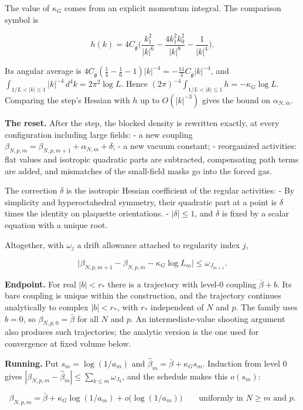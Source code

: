 \documentclass[
  letterpaper,
  11pt]{article}
\begin{document}
The value of \(\kappa_G\) comes from an explicit momentum integral. The
comparison symbol is

\[h(k)=4C_{\mathfrak g}\Big(\frac{k_1^2}{|k|^6}-\frac{4k_1^2k_0^2}{|k|^8}-\frac1{|k|^4}\Big).\]

Its angular average is
\(4C_{\mathfrak g}(\tfrac14-\tfrac16-1)|k|^{-4}=-\tfrac{11}3C_{\mathfrak g}|k|^{-4}\),
and \(\int_{1/L<|k|\le1}|k|^{-4}\,d^4k=2\pi^2\log L\). Hence
\((2\pi)^{-4}\int_{1/L<|k|\le1}h=-\kappa_G\log L\). Comparing the step's
Hessian with \(h\) up to \(O(|k|^{-3})\) gives the bound on
\(\alpha_{N,m}\).

\textbf{The reset.} After the step, the blocked density is rewritten
exactly, at every configuration including large fields: - a new coupling
\(\beta_{N,p,m}=\beta_{N,p,m+1}+\alpha_{N,m}+\delta\); - a new vacuum
constant; - reorganized activities: flat values and isotropic quadratic
parts are subtracted, compensating path terms are added, and mismatches
of the small-field masks go into the forced gas.

The correction \(\delta\) is the isotropic Hessian coefficient of the
regular activities: - By simplicity and hyperoctahedral symmetry, their
quadratic part at a point is \(\delta\) times the identity on plaquette
orientations. - \(|\delta|\le1\), and \(\delta\) is fixed by a scalar
equation with a unique root.

Altogether, with \(\omega_j\) a drift allowance attached to regularity
index \(j\),

\[\big|\beta_{N,p,m+1}-\beta_{N,p,m}-\kappa_G\log L_m\big|\le\omega_{J_{m+1}} .\]

\textbf{Endpoint.} For real \(|b|<r_\ast\) there is a trajectory with
level-\(0\) coupling \(\bar\beta+b\). Its bare coupling is unique within
the construction, and the trajectory continues analytically to complex
\(|b|<r_\ast\), with \(r_\ast\) independent of \(N\) and \(p\). The
family uses \(b=0\), so \(\beta_{N,p,0}=\bar\beta\) for all \(N\) and
\(p\). An intermediate-value shooting argument also produces such
trajectories; the analytic version is the one used for convergence at
fixed volume below.

\textbf{Running.} Put \(s_m=\log(1/a_m)\) and
\(\hat\beta_m=\bar\beta+\kappa_Gs_m\). Induction from level \(0\) gives
\(|\beta_{N,p,m}-\hat\beta_m|\le\sum_{k\le m}\omega_{J_k}\), and the
schedule makes this \(o(s_m)\):

\[\beta_{N,p,m}=\bar\beta+\kappa_G\log(1/a_m)+o\big(\log(1/a_m)\big)\qquad\text{uniformly in }N\ge m\text{ and }p.\]
\end{document}
